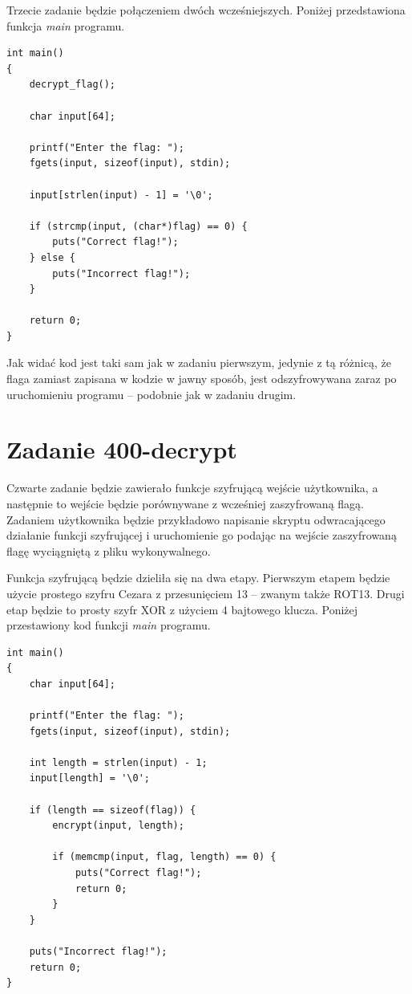 \documentclass[language=polish,type=eng]{aghmodern}
\begin{document}
Trzecie zadanie będzie połączeniem dwóch wcześniejszych.
Poniżej przedstawiona funkcja \emph{main} programu.

\begin{verbatim}
int main()
{
    decrypt_flag();

    char input[64];

    printf("Enter the flag: ");
    fgets(input, sizeof(input), stdin);

    input[strlen(input) - 1] = '\0';

    if (strcmp(input, (char*)flag) == 0) {
        puts("Correct flag!");
    } else {
        puts("Incorrect flag!");
    }

    return 0;
}
\end{verbatim}

Jak widać kod jest taki sam jak w zadaniu pierwszym, jedynie z tą różnicą, że
flaga zamiast zapisana w kodzie w jawny sposób, jest odszyfrowywana zaraz po uruchomieniu
programu -- podobnie jak w zadaniu drugim.

\section{Zadanie 400-decrypt}

Czwarte zadanie będzie zawierało funkcje szyfrującą wejście użytkownika, a następnie to wejście będzie
porównywane z wcześniej zaszyfrowaną flagą. Zadaniem użytkownika będzie przykładowo napisanie skryptu
odwracającego działanie funkcji szyfrującej i uruchomienie go podając na wejście zaszyfrowaną flagę
wyciągniętą z pliku wykonywalnego.

Funkcja szyfrującą będzie dzieliła się na dwa etapy. Pierwszym etapem będzie użycie prostego
szyfru Cezara z przesunięciem 13 -- zwanym także ROT13. Drugi etap będzie to prosty szyfr XOR
z użyciem 4 bajtowego klucza. Poniżej przestawiony kod funkcji \emph{main} programu.

\begin{verbatim}
int main()
{
    char input[64];

    printf("Enter the flag: ");
    fgets(input, sizeof(input), stdin);

    int length = strlen(input) - 1;
    input[length] = '\0';

    if (length == sizeof(flag)) {
        encrypt(input, length);

        if (memcmp(input, flag, length) == 0) {
            puts("Correct flag!");
            return 0;
        }
    }

    puts("Incorrect flag!");
    return 0;
}
\end{verbatim}
\end{document}
